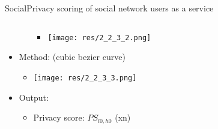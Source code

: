 \begin{frame}[noframenumbering]{Social}{Privacy scoring of social network users as a service \cite{vidyalakshmi_privacy_2015}}
\begin{columns}
\begin{column}{0.61\textwidth}
\begin{itemize}
\begin{itemize}
\begin{itemize}
								\item[] \texttt{[image: res/2\_2\_3\_2.png]}
							\end{itemize}
					\end{itemize}
							
				\item Method: (cubic bezier curve)
					\begin{itemize}
						\item[] \texttt{[image: res/2\_2\_3\_3.png]}
					\end{itemize}
					

				\item Output:
					\begin{itemize}
						\item Privacy score: $PS_{l0,h0}$ (xn)
					\end{itemize}
					
			\end{itemize}
			
		\end{column}
	\end{columns}
	
\end{frame}

